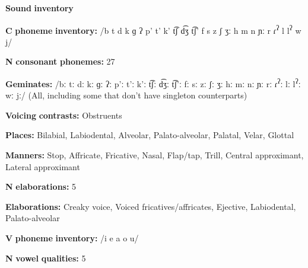 \begin{styleBody}
\textbf{Sound} \textbf{inventory}
\end{styleBody}

\begin{styleBody}
\textbf{C} \textbf{phoneme} \textbf{inventory:} /b t d k ɡ ʔ p’ t’ k’ t͡ʃ d͡ʒ t͡ʃ’ f s z ʃ ʒː h m n ɲː r ɾ\textsuperscript{ʔ} l l\textsuperscript{ʔ} w j/
\end{styleBody}

\begin{styleBody}
\textbf{N} \textbf{consonant} \textbf{phonemes:} 27
\end{styleBody}

\begin{styleBody}
\textbf{Geminates:} /bː tː dː kː ɡː ʔː p’ː t’ː k’ː t͡ʃː d͡ʒː t͡ʃ’ː fː sː zː ʃː ʒː hː mː nː ɲː rː ɾ\textsuperscript{ʔ}ː lː l\textsuperscript{ʔ}ː wː jː/ (All, including some that don’t have singleton counterparts)
\end{styleBody}

\begin{styleBody}
\textbf{Voicing} \textbf{contrasts:} Obstruents
\end{styleBody}

\begin{styleBody}
\textbf{Places:} Bilabial, Labiodental, Alveolar, Palato-alveolar, Palatal, Velar, Glottal
\end{styleBody}

\begin{styleBody}
\textbf{Manners:} Stop, Affricate, Fricative, Nasal, Flap/tap, Trill, Central approximant, Lateral approximant
\end{styleBody}

\begin{styleBody}
\textbf{N} \textbf{elaborations:} 5
\end{styleBody}

\begin{styleBody}
\textbf{Elaborations:} Creaky voice, Voiced fricatives/affricates, Ejective, Labiodental, Palato-alveolar
\end{styleBody}

\begin{styleBody}
\textbf{V} \textbf{phoneme} \textbf{inventory:} /i e a o u/
\end{styleBody}

\begin{styleBody}
\textbf{N} \textbf{vowel} \textbf{qualities:} 5
\end{styleBody}

